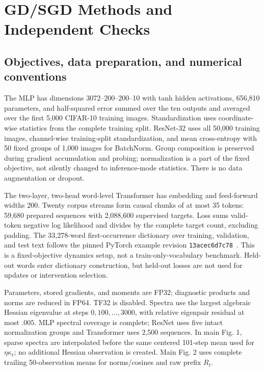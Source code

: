\section{GD/SGD Methods and Independent Checks}

\subsection{Objectives, data preparation, and numerical conventions}
The MLP has dimensions 3072--200--200--10 with tanh hidden activations, 656,810 parameters, and half-squared error summed over the ten outputs and averaged over the first 5,000 CIFAR-10 training images. Standardization uses coordinate-wise statistics from the complete training split. ResNet-32 uses all 50,000 training images, channel-wise training-split standardization, and mean cross-entropy with 50 fixed groups of 1,000 images for BatchNorm. Group composition is preserved during gradient accumulation and probing; normalization is a part of the fixed objective, not silently changed to inference-mode statistics. There is no data augmentation or dropout.

The two-layer, two-head word-level Transformer has embedding and feed-forward widths 200. Twenty corpus streams form causal chunks of at most 35 tokens: 59,680 prepared sequences with 2,088,600 supervised targets. Loss sums valid-token negative log likelihood and divides by the complete target count, excluding padding. The 33,278-word first-occurrence dictionary over training, validation, and test text follows the pinned PyTorch example revision \texttt{13acec6d7c78}~\cite{pytorchWordLanguageModelPinned}. This is a fixed-objective dynamics setup, not a train-only-vocabulary benchmark. Held-out words enter dictionary construction, but held-out losses are not used for updates or intervention selection.

Parameters, stored gradients, and moments are FP32; diagnostic products and norms are reduced in FP64. TF32 is disabled. Spectra use the largest algebraic Hessian eigenvalue at steps $0,100,\ldots,3000$, with relative eigenpair residual at most $.005$. MLP spectral coverage is complete; ResNet uses five intact normalization groups and Transformer uses 2,500 sequences. In main Fig. 1, sparse spectra are interpolated before the same centered 101-step mean used for $\eta\widehat\kappa_t$; no additional Hessian observation is created. Main Fig. 2 uses complete trailing 50-observation means for norms/cosines and raw prefix $R_t$.

